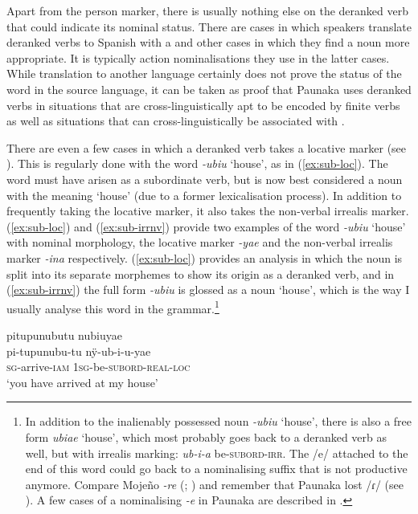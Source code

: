 Apart from the person marker, there is usually nothing else on the deranked verb that could indicate its nominal status. There are cases in which speakers translate deranked verbs to Spanish with a  and other cases in which they find a noun more appropriate. It is typically action nominalisations %
 \citep[cf.][335]{ComrieThompson2007} they use in the latter cases. While translation to another language certainly does not prove the status of the word in the source language, it can be taken as proof that Paunaka uses deranked verbs in situations that are cross-linguistically apt to be encoded by finite verbs as well as situations that can cross-linguistically be associated with .

There are even a few cases in which a deranked verb takes a locative marker (see ). This is regularly done with the word \textit{-ubiu} ‘house’, as in (\ref{ex:sub-loc}). The word must have arisen as a subordinate verb, but is now best considered a noun with the meaning ‘house’ (due to a former lexicalisation process). In addition to frequently taking the locative marker, it also takes the non-verbal irrealis marker. (\ref{ex:sub-loc}) and (\ref{ex:sub-irrnv}) provide two examples of the word \textit{-ubiu} ‘house’ with nominal morphology, the locative marker \textit{-yae} and the non-verbal irrealis marker \textit{-ina} respectively. (\ref{ex:sub-loc}) provides an analysis in which the noun is split into its separate morphemes to show its origin as a deranked verb, and in (\ref{ex:sub-irrnv}) the full form \textit{-ubiu} is glossed as a noun ‘house’, which is the way I usually analyse this word in the grammar.\footnote{In addition to the inalienably possessed noun \textit{-ubiu} ‘house’, there is also a free form \textit{ubiae} ‘house’, which most probably goes back to a deranked verb as well, but with irrealis marking: \textit{ub-i-a} be-\textsc{subord}-\textsc{irr}. The /e/ attached to the end of this word could go back to a nominalising suffix that is not productive anymore. Compare Mojeño \textit{-re} (\citealt[630]{OlzaZubiri2004}; \citealt[85]{Rose2014a}) and remember that Paunaka lost /ɾ/ (see ). A few cases of a nominalising \textit{-e} in Paunaka are described in .}


\ea\label{ex:sub-loc}
\begingl
\glpreamble pitupunubutu nubiuyae\\
\gla pi-tupunubu-tu nÿ-ub-i-u-yae\\
\textsc{sg}-arrive-\textsc{iam} 1\textsc{sg}-be-\textsc{subord}-\textsc{real}-\textsc{loc}\\
\glft ‘you have arrived at my house’
\endgl
\trailingcitation{[rxx-e181017l]}
\xe

